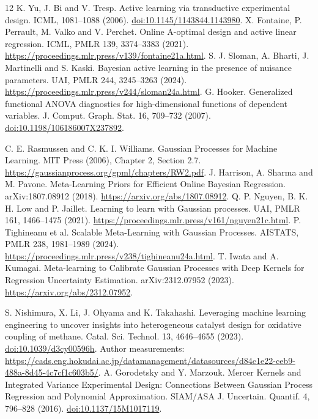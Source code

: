\begin{thebibliography}{12}
 K. Yu, J. Bi and V. Tresp. Active learning via transductive experimental design. ICML, 1081--1088 (2006). \href{https://doi.org/10.1145/1143844.1143980}{doi:10.1145/1143844.1143980}.
 X. Fontaine, P. Perrault, M. Valko and V. Perchet. Online A-optimal design and active linear regression. ICML, PMLR 139, 3374--3383 (2021). \url{https://proceedings.mlr.press/v139/fontaine21a.html}.
 S. J. Sloman, A. Bharti, J. Martinelli and S. Kaski. Bayesian active learning in the presence of nuisance parameters. UAI, PMLR 244, 3245--3263 (2024). \url{https://proceedings.mlr.press/v244/sloman24a.html}.
 G. Hooker. Generalized functional ANOVA diagnostics for high-dimensional functions of dependent variables. J. Comput. Graph. Stat. 16, 709--732 (2007). \href{https://doi.org/10.1198/106186007X237892}{doi:10.1198/106186007X237892}.


 C. E. Rasmussen and C. K. I. Williams. Gaussian Processes for Machine Learning. MIT Press (2006), Chapter 2, Section 2.7. \url{https://gaussianprocess.org/gpml/chapters/RW2.pdf}.
 J. Harrison, A. Sharma and M. Pavone. Meta-Learning Priors for Efficient Online Bayesian Regression. arXiv:1807.08912 (2018). \url{https://arxiv.org/abs/1807.08912}.
 Q. P. Nguyen, B. K. H. Low and P. Jaillet. Learning to learn with Gaussian processes. UAI, PMLR 161, 1466--1475 (2021). \url{https://proceedings.mlr.press/v161/nguyen21c.html}.
 P. Tighineanu et al. Scalable Meta-Learning with Gaussian Processes. AISTATS, PMLR 238, 1981--1989 (2024). \url{https://proceedings.mlr.press/v238/tighineanu24a.html}.
 T. Iwata and A. Kumagai. Meta-learning to Calibrate Gaussian Processes with Deep Kernels for Regression Uncertainty Estimation. arXiv:2312.07952 (2023). \url{https://arxiv.org/abs/2312.07952}.


 S. Nishimura, X. Li, J. Ohyama and K. Takahashi. Leveraging machine learning engineering to uncover insights into heterogeneous catalyst design for oxidative coupling of methane. Catal. Sci. Technol. 13, 4646--4655 (2023). \href{https://doi.org/10.1039/d3cy00596h}{doi:10.1039/d3cy00596h}. Author measurements: \url{https://cads.eng.hokudai.ac.jp/datamanagement/datasources/d84c1e22-ceb9-488a-8d45-4c7cf1c603b5/}.
 A. Gorodetsky and Y. Marzouk. Mercer Kernels and Integrated Variance Experimental Design: Connections Between Gaussian Process Regression and Polynomial Approximation. SIAM/ASA J. Uncertain. Quantif. 4, 796--828 (2016). \href{https://doi.org/10.1137/15M1017119}{doi:10.1137/15M1017119}.

\end{thebibliography}
